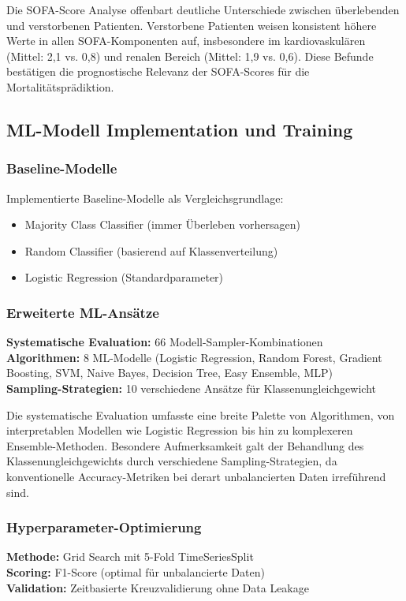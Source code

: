 \documentclass[12pt]{article}
\begin{document}
Die SOFA-Score Analyse offenbart deutliche Unterschiede zwischen überlebenden und verstorbenen Patienten. Verstorbene Patienten weisen konsistent höhere Werte in allen SOFA-Komponenten auf, insbesondere im kardiovaskulären (Mittel: 2,1 vs. 0,8) und renalen Bereich (Mittel: 1,9 vs. 0,6). Diese Befunde bestätigen die prognostische Relevanz der SOFA-Scores für die Mortalitätsprädiktion.

\subsection{ML-Modell Implementation und Training}

\subsubsection{Baseline-Modelle}
Implementierte Baseline-Modelle als Vergleichsgrundlage:
\begin{itemize}
    \item Majority Class Classifier (immer Überleben vorhersagen)
    \item Random Classifier (basierend auf Klassenverteilung)
    \item Logistic Regression (Standardparameter)
\end{itemize}

\subsubsection{Erweiterte ML-Ansätze}
\textbf{Systematische Evaluation:} 66 Modell-Sampler-Kombinationen\\
\textbf{Algorithmen:} 8 ML-Modelle (Logistic Regression, Random Forest, Gradient Boosting, SVM, Naive Bayes, Decision Tree, Easy Ensemble, MLP)\\
\textbf{Sampling-Strategien:} 10 verschiedene Ansätze für Klassenungleichgewicht

Die systematische Evaluation umfasste eine breite Palette von Algorithmen, von interpretablen Modellen wie Logistic Regression bis hin zu komplexeren Ensemble-Methoden. Besondere Aufmerksamkeit galt der Behandlung des Klassenungleichgewichts durch verschiedene Sampling-Strategien, da konventionelle Accuracy-Metriken bei derart unbalancierten Daten irreführend sind.

\subsubsection{Hyperparameter-Optimierung}
\textbf{Methode:} Grid Search mit 5-Fold TimeSeriesSplit\\
\textbf{Scoring:} F1-Score (optimal für unbalancierte Daten)\\
\textbf{Validation:} Zeitbasierte Kreuzvalidierung ohne Data Leakage
\end{document}
